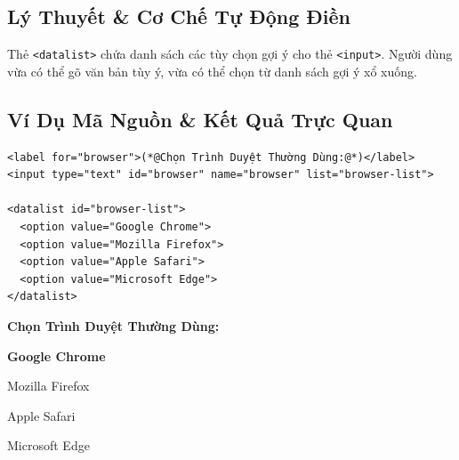 \documentclass[11pt,oneside]{book}
\newcommand{\codeinline}[1]{\textcolor{accentOrange}{\texttt{#1}}}
\begin{document}
\subsection{Lý Thuyết \& Cơ Chế Tự Động Điền}

Thẻ \codeinline{<datalist>} chứa danh sách các tùy chọn gợi ý cho thẻ \codeinline{<input>}. Người dùng vừa có thể gõ văn bản tùy ý, vừa có thể chọn từ danh sách gợi ý xổ xuống.

\subsection{Ví Dụ Mã Nguồn \& Kết Quả Trực Quan}

\begin{codeWindow}
\begin{lstlisting}[language=HTML5]
<label for="browser">(*@Chọn Trình Duyệt Thường Dùng:@*)</label>
<input type="text" id="browser" name="browser" list="browser-list">

<datalist id="browser-list">
  <option value="Google Chrome">
  <option value="Mozilla Firefox">
  <option value="Apple Safari">
  <option value="Microsoft Edge">
</datalist>
\end{lstlisting}
\end{codeWindow}

\begin{browserWindow}
\sffamily\small
\begin{center}
\textbf{Chọn Trình Duyệt Thường Dùng:}  \par\vspace{3pt}
\begin{tcolorbox}[arc=2pt, colback=white, colframe=gray!40, boxsep=4pt, width=0.55\linewidth]
  \small
  \textcolor{primaryBlue}{\textbf{Google Chrome}} \par\vspace{2pt}
  Mozilla Firefox \par\vspace{2pt}
  Apple Safari \par\vspace{2pt}
  Microsoft Edge
\end{tcolorbox}
\end{center}
\end{browserWindow}

\end{document}
